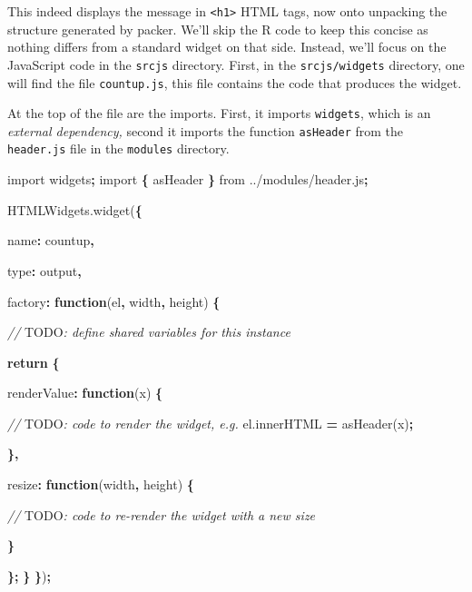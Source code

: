 \documentclass[
  10pt,
]{krantz}
\makeatletter
\newenvironment{Shaded}{\begin{snugshade}}{\end{snugshade}}
\newcommand{\AlertTok}[1]{\textcolor[rgb]{0.33,0.33,0.33}{#1}}
\newcommand{\AttributeTok}[1]{\textcolor[rgb]{0.61,0.61,0.61}{#1}}
\newcommand{\CommentTok}[1]{\textcolor[rgb]{0.37,0.37,0.37}{\textit{#1}}}
\newcommand{\ControlFlowTok}[1]{\textcolor[rgb]{0.27,0.27,0.27}{\textbf{#1}}}
\newcommand{\DataTypeTok}[1]{\textcolor[rgb]{0.27,0.27,0.27}{#1}}
\newcommand{\ImportTok}[1]{#1}
\newcommand{\KeywordTok}[1]{\textcolor[rgb]{0.27,0.27,0.27}{\textbf{#1}}}
\newcommand{\NormalTok}[1]{#1}
\newcommand{\OperatorTok}[1]{\textcolor[rgb]{0.43,0.43,0.43}{\textbf{#1}}}
\newcommand{\StringTok}[1]{\textcolor[rgb]{0.5,0.5,0.5}{#1}}
\newcommand{\VariableTok}[1]{\textcolor[rgb]{0,0,0}{#1}}
\newenvironment{kframe}{%
\medskip{}
\setlength{\fboxsep}{.8em}
 \def\at@end@of@kframe{}%
 \ifinner\ifhmode%
  \def\at@end@of@kframe{\end{minipage}}%
  \begin{minipage}{\columnwidth}%
 \fi\fi%
 \def\FrameCommand##1{\hskip\@totalleftmargin \hskip-\fboxsep
 \colorbox{shadecolor}{##1}\hskip-\fboxsep
     \hskip-\linewidth \hskip-\@totalleftmargin \hskip\columnwidth}%
 \MakeFramed {\advance\hsize-\width
   \@totalleftmargin\z@ \linewidth\hsize
   \@setminipage}}%
 {\par\unskip\endMakeFramed%
 \at@end@of@kframe}
\renewenvironment{Shaded}{\begin{kframe}}{\end{kframe}}
\makeatother
\begin{document}
This indeed displays the message in \texttt{\textless{}h1\textgreater{}} HTML tags, now onto unpacking the structure generated by packer. We'll skip the R code to keep this concise as nothing differs from a standard widget on that side. Instead, we'll focus on the JavaScript code in the \texttt{srcjs} directory. First, in the \texttt{srcjs/widgets} directory, one will find the file \texttt{countup.js}, this file contains the code that produces the widget.

At the top of the file are the imports. First, it imports \texttt{widgets}, which is an \emph{external dependency,} second it imports the function \texttt{asHeader} from the \texttt{header.js} file in the \texttt{modules} directory.

\begin{Shaded}
\begin{Highlighting}[]
\ImportTok{import} \StringTok{\textquotesingle{}widgets\textquotesingle{}}\OperatorTok{;}
\ImportTok{import} \OperatorTok{\{}\NormalTok{ asHeader }\OperatorTok{\}} \ImportTok{from} \StringTok{\textquotesingle{}../modules/header.js\textquotesingle{}}\OperatorTok{;} 

\VariableTok{HTMLWidgets}\NormalTok{.}\AttributeTok{widget}\NormalTok{(}\OperatorTok{\{}

  \DataTypeTok{name}\OperatorTok{:} \StringTok{\textquotesingle{}countup\textquotesingle{}}\OperatorTok{,}

  \DataTypeTok{type}\OperatorTok{:} \StringTok{\textquotesingle{}output\textquotesingle{}}\OperatorTok{,}

  \DataTypeTok{factory}\OperatorTok{:} \KeywordTok{function}\NormalTok{(el}\OperatorTok{,}\NormalTok{ width}\OperatorTok{,}\NormalTok{ height) }\OperatorTok{\{}

    \CommentTok{// }\AlertTok{TODO}\CommentTok{: define shared variables for this instance}

    \ControlFlowTok{return} \OperatorTok{\{}

      \DataTypeTok{renderValue}\OperatorTok{:} \KeywordTok{function}\NormalTok{(x) }\OperatorTok{\{}

        \CommentTok{// }\AlertTok{TODO}\CommentTok{: code to render the widget, e.g.}
        \VariableTok{el}\NormalTok{.}\AttributeTok{innerHTML} \OperatorTok{=} \AttributeTok{asHeader}\NormalTok{(x)}\OperatorTok{;}

      \OperatorTok{\},}

      \DataTypeTok{resize}\OperatorTok{:} \KeywordTok{function}\NormalTok{(width}\OperatorTok{,}\NormalTok{ height) }\OperatorTok{\{}

        \CommentTok{// }\AlertTok{TODO}\CommentTok{: code to re{-}render the widget with a new size}

      \OperatorTok{\}}

    \OperatorTok{\};}
  \OperatorTok{\}}
\OperatorTok{\}}\NormalTok{)}\OperatorTok{;}
\end{Highlighting}
\end{Shaded}
\end{document}
